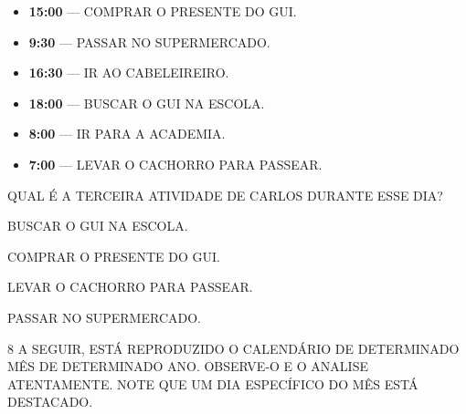 
\begin{myquote}
\begin{itemize}[itemsep=10pt]
  \item \textbf{15:00} --- \uppercase{Comprar o presente do Gui.}
  \item \textbf{9:30} --- \uppercase{Passar no supermercado.}
  \item \textbf{16:30} --- \uppercase{Ir ao cabeleireiro.}
  \item \textbf{18:00} --- \uppercase{Buscar o Gui na escola.}
  \item \textbf{8:00} --- \uppercase{Ir para a academia.}
  \item \textbf{7:00} --- \uppercase{Levar o cachorro para passear.}
\end{itemize}
\end{myquote}

QUAL É A TERCEIRA ATIVIDADE DE CARLOS DURANTE ESSE DIA?

\begin{escolha}%
\item BUSCAR O GUI NA ESCOLA.

\item COMPRAR O PRESENTE DO GUI.

\item LEVAR O CACHORRO PARA PASSEAR.

\item PASSAR NO SUPERMERCADO.
\end{escolha}

\num{8} A SEGUIR, ESTÁ REPRODUZIDO O CALENDÁRIO DE DETERMINADO MÊS DE DETERMINADO ANO. OBSERVE-O E O ANALISE ATENTAMENTE. NOTE QUE UM DIA ESPECÍFICO DO MÊS ESTÁ DESTACADO.\bigskip

